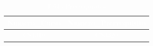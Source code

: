 \documentclass[a4paper,12pt]{article}
\begin{document}
\begin{table}[h]
    \centering
    \caption{\textcolor{white}{Tabla Prerrequisitos}}
    \label{tabla_prerrequisitos}
    \textcolor{white}{
    \begin{tabular}{|c|c|}
    \hline
        Numero\_Curso & Numero\_Prerrequisito \\ \hline
        CS1310        & CS3320 \\
    \hline
    \end{tabular}
    }
\end{table}
    


    




\end{document}
